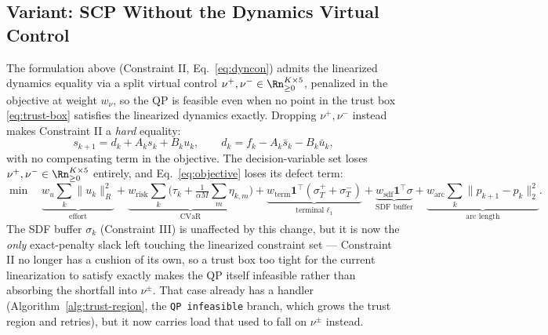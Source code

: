 \subsection{Variant: SCP Without the Dynamics Virtual Control}
\label{sec:no-nu-variant}

The formulation above (Constraint II, Eq.~\eqref{eq:dyncon}) admits the linearized
dynamics equality via a split virtual control $\nu^{+},\nu^{-}\in\Rn^{K\times5}_{\ge0}$,
penalized in the objective at weight $w_\nu$, so the QP is feasible even when no
point in the trust box \eqref{eq:trust-box} satisfies the linearized dynamics
exactly. Dropping $\nu^{+},\nu^{-}$ instead makes Constraint II a \emph{hard}
equality:
\begin{equation}
s_{k+1} = d_k + A_k s_k + B_k u_k, \qquad
d_k = f_k - A_k \bar{s}_k - B_k \bar{u}_k,
\label{eq:dyncon-nonu}
\end{equation}
with no compensating term in the objective. The decision-variable set loses
$\nu^{+},\nu^{-}\in\Rn^{K\times5}_{\ge0}$ entirely, and Eq.~\eqref{eq:objective}
loses its defect term:
\begin{equation}
\min\quad \underbrace{w_u \sum_{k} \|u_k\|_R^2}_{\text{effort}}
+ \underbrace{w_{\text{risk}} \sum_{k}\!\Big(\tau_k + \tfrac{1}{\alpha M}\!\sum_{m}\eta_{k,m}\Big)}_{\text{CVaR}}
+ \underbrace{w_{\text{term}}\mathbf{1}^\top(\sigma_T^{+}\!+\!\sigma_T^{-})}_{\text{terminal }\ell_1}
+ \underbrace{w_{\text{sdf}}\mathbf{1}^\top\sigma}_{\text{SDF buffer}}
+ \underbrace{w_{\text{arc}}\!\sum_{k}\|p_{k+1}\!-\!p_k\|_2^2}_{\text{arc length}}.
\label{eq:objective-nonu}
\end{equation}
The SDF buffer $\sigma_k$ (Constraint III) is unaffected by this change, but
it is now the \emph{only} exact-penalty slack left touching the linearized
constraint set --- Constraint II no longer has a cushion of its own, so a
trust box too tight for the current linearization to satisfy exactly makes
the QP itself infeasible rather than absorbing the shortfall into $\nu^\pm$.
That case already has a handler (Algorithm~\ref{alg:trust-region}, the
\texttt{QP infeasible} branch, which grows the trust region and retries), but
it now carries load that used to fall on $\nu^\pm$ instead.

